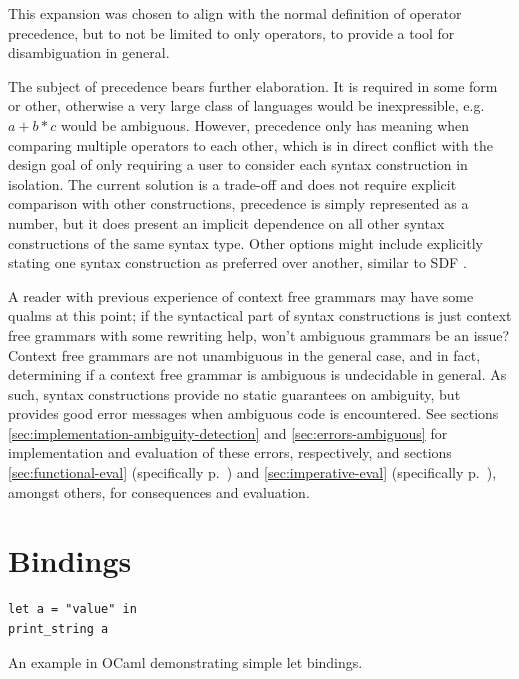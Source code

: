 \documentclass{kththesis}
\begin{document}
This expansion was chosen to align with the normal definition of operator precedence, but to not be limited to only operators, to provide a tool for disambiguation in general.

The subject of precedence bears further elaboration. It is required in some form or other, otherwise a very large class of languages would be inexpressible, e.g. $a + b * c$ would be ambiguous. However, precedence only has meaning when comparing multiple operators to each other, which is in direct conflict with the design goal of only requiring a user to consider each syntax construction in isolation. The current solution is a trade-off and does not require explicit comparison with other constructions, precedence is simply represented as a number, but it does present an implicit dependence on all other syntax constructions of the same syntax type. Other options might include explicitly stating one syntax construction as preferred over another, similar to SDF \cite{Heering1989The-syntax-defi}.

A reader with previous experience of context free grammars may have some qualms at this point; if the syntactical part of syntax constructions is just context free grammars with some rewriting help, won't ambiguous grammars be an issue? Context free grammars are not unambiguous in the general case, and in fact, determining if a context free grammar is ambiguous is undecidable in general. As such, syntax constructions provide no static guarantees on ambiguity, but provides good error messages when ambiguous code is encountered. See sections \ref{sec:implementation-ambiguity-detection} and \ref{sec:errors-ambiguous} for implementation and evaluation of these errors, respectively, and sections \ref{sec:functional-eval} (specifically p.~\pageref{sec:ambiguous-lists}) and \ref{sec:imperative-eval} (specifically p.~\pageref{sec:lua-func-call-precedence}), amongst others, for consequences and evaluation.

\section{Bindings} \label{sec:design-bindings}

\begin{listing}[h]
\begin{verbatim}
let a = "value" in
print_string a
\end{verbatim}
\caption{An example in OCaml demonstrating simple let bindings.}
\label{lst:nested-binding-example}
\end{listing}
\end{document}
